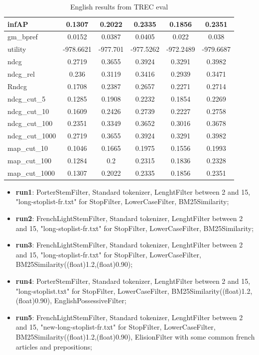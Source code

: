 \begin{table}[h!]
\begin{tabular}{ |l|c|c|c|c|c| }
        infAP & 0.1307 & 0.2022 & 0.2335 & 0.1856 & 0.2351 \\ \hline
        gm\_bpref & 0.0152 & 0.0387 & 0.0405 & 0.022 & 0.038 \\ \hline
        utility & -978.6621 & -977.701 & -977.5262 & -972.2489 & -979.6687 \\ \hline
        ndcg & 0.2719 & 0.3655 & 0.3924 & 0.3291 & 0.3982 \\ \hline
        ndcg\_rel & 0.236 & 0.3119 & 0.3416 & 0.2939 & 0.3471 \\ \hline
        Rndcg & 0.1708 & 0.2387 & 0.2657 & 0.2271 & 0.2714 \\ \hline
        ndcg\_cut\_5 & 0.1285 & 0.1908 & 0.2232 & 0.1854 & 0.2269 \\ \hline
        ndcg\_cut\_10 & 0.1609 & 0.2426 & 0.2739 & 0.2227 & 0.2758 \\ \hline
        ndcg\_cut\_100 & 0.2351 & 0.3349 & 0.3652 & 0.3016 & 0.3678 \\ \hline
        ndcg\_cut\_1000 & 0.2719 & 0.3655 & 0.3924 & 0.3291 & 0.3982 \\ \hline
        map\_cut\_10 & 0.1046 & 0.1665 & 0.1975 & 0.1556 & 0.1993 \\ \hline
        map\_cut\_100 & 0.1284 & 0.2 & 0.2315 & 0.1836 & 0.2328 \\ \hline
        map\_cut\_1000 & 0.1307 & 0.2022 & 0.2335 & 0.1856 & 0.2351 \\ \hline
        
    \end{tabular}
    \caption{English results from TREC eval}
    \label{table:results}
\end{table}

\begin{itemize}
    \item \textbf{run1}: PorterStemFilter, Standard tokenizer, LenghtFilter between 2 and 15, "long-stoplist-fr.txt" for StopFilter, LowerCaseFilter, BM25Similarity;
    \item \textbf{run2}: FrenchLightStemFilter, Standard tokenizer, LenghtFilter between 2 and 15, "long-stoplist-fr.txt" for StopFilter, LowerCaseFilter, BM25Similarity;
    \item \textbf{run3}: FrenchLightStemFilter, Standard tokenizer, LenghtFilter between 2 and 15, "long-stoplist-fr.txt" for StopFilter, LowerCaseFilter,\\ BM25Similarity((float)1.2,(float)0.90);
    \item \textbf{run4}: PorterStemFilter, Standard tokenizer, LenghtFilter between 2 and 15, "long-stoplist.txt" for StopFilter, LowerCaseFilter, BM25Similarity((float)1.2,(float)0.90), EnglishPossessiveFilter;
    \item \textbf{run5}: FrenchLightStemFilter, Standard tokenizer, LenghtFilter between 2 and 15, "new-long-stoplist-fr.txt" for StopFilter, LowerCaseFilter,\\ BM25Similarity((float)1.2,(float)0.90), ElisionFilter with some common french articles and prepositions;
\end{itemize}




